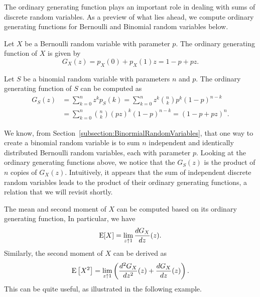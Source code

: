 The ordinary generating function plays an important role in dealing with sums of discrete random variables.
As a preview of what lies ahead, we compute ordinary generating functions for Bernoulli and Binomial random variables below.

\begin{example}
Let $X$ be a Bernoulli random variable with parameter $p$.
The ordinary generating function of $X$ is given by
\begin{equation*}
G_X(z) = p_X(0) + p_X(1) z
= 1 - p + pz .
\end{equation*}
\end{example}

\begin{example}
Let $S$ be a binomial random variable with parameters $n$ and $p$.
The ordinary generating function of $S$ can be computed as
\begin{equation*}
\begin{split}
G_S(z) &= \sum_{k=0}^{n} z^k p_S (k)
= \sum_{k=0}^{n} z^k \binom{n}{k} p^k (1 - p)^{n-k} \\
&= \sum_{k=0}^{n} \binom{n}{k} (pz)^k (1 - p)^{n-k}
= (1 - p + pz)^n .
\end{split}
\end{equation*}
\end{example}

We know, from Section~\ref{subsection:BinormialRandomVariables}, that one way to create a binomial random variable is to sum $n$ independent and identically distributed Bernoulli random variables, each with parameter $p$.
Looking at the ordinary generating functions above, we notice that the $G_S(z)$ is the product of $n$ copies of $G_X(z)$.
Intuitively, it appears that the sum of independent discrete random variables leads to the product of their ordinary generating functions, a relation that we will revisit shortly.

The mean and second moment of $X$ can be computed based on its ordinary generating function,
In particular, we have
\begin{equation*}
\mathrm{E} [X] = \lim_{z \uparrow 1} \frac{d G_X}{dz}(z) .
\end{equation*}
Similarly, the second moment of $X$ can be derived as
\begin{equation*}
\mathrm{E} \left[ X^2 \right]
= \lim_{z \uparrow 1} \left( \frac{d^2 G_X}{dz^2}(z) + \frac{d G_X}{dz}(z) \right) .
\end{equation*}
This can be quite useful, as illustrated in the following example.


